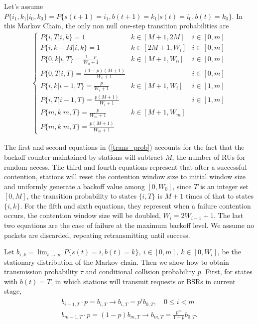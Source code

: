 \documentclass[journal]{IEEEtran}
\begin{document}
Let's assume $P\lbrace i_1, k_1|i_0,k_0\rbrace = P\lbrace s(t+1) = i_1, b(t+1)= k_1|s(t) = i_0, b(t) = k_0\rbrace $. In this Markov Chain, the only non null one-step transition probabilities are 
\begin{align}
\left\lbrace
\begin{array}{lll}
P\lbrace i, T | i, k \rbrace = 1  						& k\in [M+1,2M]			& i \in [0,m]\\ [3pt]
P\lbrace i, k-M | i, k \rbrace = 1  					& k\in [2M+1,W_i]   	& i \in [0,m]\\ [3pt]
P\lbrace 0, k | i, T \rbrace = \frac{1-p}{W_0+1}  		& k\in [M+1,W_0]		& i \in [0,m]\\ [3pt]
P\lbrace 0, T | i, T \rbrace = \frac{(1-p)(M+1)}{W_0+1} &						& i \in [0,m]\\ [3pt]
P\lbrace i, k | i-1, T \rbrace = \frac{p}{W_i+1} 		& k\in [M+1,W_i] 		& i \in [1,m]\\ [3pt]
P\lbrace i, T | i-1, T \rbrace = \frac{p(M+1)}{W_i+1}   &	  					& i \in [1,m]\\ [3pt]
P\lbrace m, k | m, T \rbrace = \frac{p}{W_m+1} 		 	& k\in [M+1,W_m] 		& \\ [3pt]
P\lbrace m, k | m, T \rbrace = \frac{p(M+1)}{W_m+1}
\end{array}
\right.
\label{trans_prob}
\end{align}

The first and second equations in (\ref{trans_prob}) accounts for the fact that the backoff counter maintained by stations will subtract $M$, the number of RUs for random access. 
The third and fourth equations represent that after a successful contention, stations will reset the contention window size to initial window size and uniformly generate a backoff value among $[0,W_0]$, since $T$ is an integer set $[0,M]$, the transition probability to states $\lbrace i, T \rbrace$ is $M+1$ times of that to states $\lbrace i, k \rbrace$. 
For the fifth and sixth equations, they represent when a failure contention occurs, the contention window size will be doubled, $W_i=2W_{i-1}+1$.
The last two equations are the case of failure at the maximum backoff level. 
We assume no packets are discarded, repeating retransmitting until success.

Let $b_{i,k} = \lim_{t\rightarrow \infty} P\lbrace s(t) = i, b(t) = k\rbrace,\ i\in [0,m], \ k \in [0,W_i]$, be the stationary distribution of the Markov chain. 
Then we show how to obtain transmission probability $\tau$ and conditional collision probability $p$.
First,  for states with $b(t) = T$, in which stations will transmit requests or BSRs in current stage, 
\begin{align}
b_{i-1,T}\cdot p = b_{i,T} 		\rightarrow b_{i,T} = p^i b_{0,T}, \quad 0\leq i < m \nonumber\\
b_{m-1,T}\cdot p = (1-p) b_{m,T}	\rightarrow b_{m,T} = \frac{p^m}{1-p}b_{0,T}.
\label{biT}
\end{align}
\end{document}
